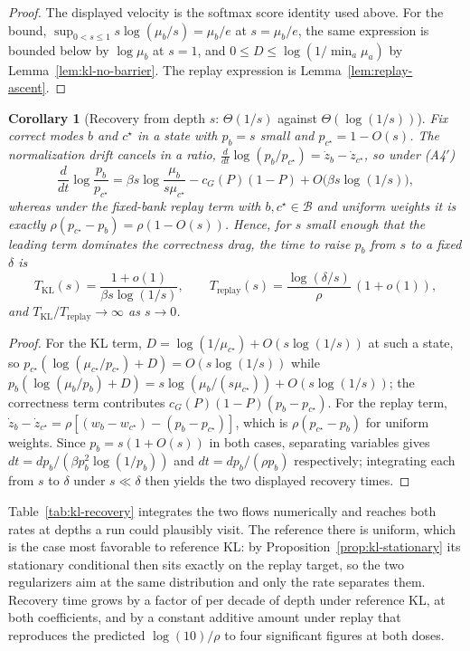 \documentclass{article}
\newcommand{\1}{\mathbf 1}
\newtheorem{corollary}[lemma]{Corollary}
\theoremstyle{remark}
\theoremstyle{definition}
\theoremstyle{plain}
\begin{document}
\begin{proof}
The displayed velocity is the softmax score identity used above. For the
bound, $\sup_{0<s\le1}s\log(\mu_b/s)=\mu_b/e$ at $s=\mu_b/e$, the same
expression is bounded below by $\log\mu_b$ at $s=1$, and $0\le D\le
\log(1/\min_a\mu_a)$ by Lemma~\ref{lem:kl-no-barrier}. The replay expression is
Lemma~\ref{lem:replay-ascent}.
\end{proof}

\begin{corollary}[Recovery from depth $s$: $\Theta(1/s)$ against $\Theta(\log(1/s))$]
\label{cor:kl-recovery-time}
Fix correct modes $b$ and $c^\star$ in a state with $p_b=s$ small and
$p_{c^\star}=1-O(s)$. The normalization drift cancels in a ratio,
$\frac{d}{dt}\log(p_b/p_{c^\star})=\dot z_b-\dot z_{c^\star}$, so under
(A4$'$)
\[
  \frac{d}{dt}\log\frac{p_b}{p_{c^\star}}
  =\beta s\log\frac{\mu_b}{s\mu_{c^\star}}-c_G(P)(1-P)+O\!\big(\beta s\log(1/s)\big),
\]
whereas under the fixed-bank replay term with $b,c^\star\in\mathcal B$ and
uniform weights it is exactly $\rho(p_{c^\star}-p_b)=\rho(1-O(s))$. Hence, for
$s$ small enough that the leading term dominates the correctness drag, the
time to raise $p_b$ from $s$ to a fixed $\delta$ is
\[
  T_{\mathrm{KL}}(s)=\frac{1+o(1)}{\beta s\log(1/s)},
  \qquad
  T_{\mathrm{replay}}(s)=\frac{\log(\delta/s)}{\rho}\,(1+o(1)),
\]
and $T_{\mathrm{KL}}/T_{\mathrm{replay}}\to\infty$ as $s\to0$.
\end{corollary}

\begin{proof}
For the KL term, $D=\log(1/\mu_{c^\star})+O(s\log(1/s))$ at such a state, so
$p_{c^\star}(\log(\mu_{c^\star}/p_{c^\star})+D)=O(s\log(1/s))$ while
$p_b(\log(\mu_b/p_b)+D)=s\log(\mu_b/(s\mu_{c^\star}))+O(s\log(1/s))$; the
correctness term contributes $c_G(P)(1-P)(p_b-p_{c^\star})$. For the replay
term, $\dot z_b-\dot z_{c^\star}=\rho[(w_b-w_{c^\star})-(p_b-p_{c^\star})]$,
which is $\rho(p_{c^\star}-p_b)$ for uniform weights. Since
$p_b=s(1+O(s))$ in both cases, separating variables gives
$dt=dp_b/(\beta p_b^2\log(1/p_b))$ and $dt=dp_b/(\rho p_b)$ respectively;
integrating each from $s$ to $\delta$ under $s\ll\delta$ then yields the two
displayed recovery times.
\end{proof}

Table~\ref{tab:kl-recovery} integrates the two flows numerically and reaches
both rates at depths a run could plausibly visit. The reference there is
uniform, which is the case most favorable to reference KL: by
Proposition~\ref{prop:kl-stationary} its stationary conditional then sits
exactly on the replay target, so the two regularizers aim at the same
distribution and only the rate separates them. Recovery time grows by a factor
of \MDklDecadeKL{} per decade of depth under reference KL, at both
coefficients, and by a constant additive amount under replay that reproduces
the predicted $\log(10)/\rho$ to four significant figures at both doses.
\end{document}
